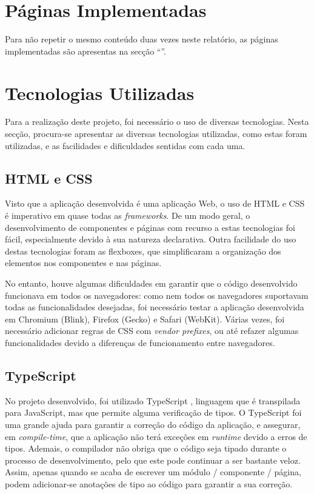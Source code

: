\documentclass[12pt, a4paper]{article}
\begin{document}
\section{Páginas Implementadas}

Para não repetir o mesmo conteúdo duas vezes neste relatório, as páginas implementadas são
apresentas na secção ``''.

\section{Tecnologias Utilizadas}

Para a realização deste projeto, foi necessário o uso de diversas tecnologias. Nesta secção,
procura-se apresentar as diversas tecnologias utilizadas, como estas foram utilizadas, e as
facilidades e dificuldades sentidas com cada uma.

\subsection{HTML e CSS}

Visto que a aplicação desenvolvida é uma aplicação Web, o uso de HTML e CSS é imperativo em quase
todas as \emph{frameworks}. De um modo geral, o desenvolvimento de componentes e páginas com recurso
a estas tecnologias foi fácil, especialmente devido à sua natureza declarativa. Outra facilidade do
uso destas tecnologias foram as flexboxes, que simplificaram a organização dos elementos nos
componentes e nas páginas.

No entanto, houve algumas dificuldades em garantir que o código desenvolvido funcionava em todos os
navegadores: como nem todos os navegadores suportavam todas as funcionalidades desejadas, foi
necessário testar a aplicação desenvolvida em Chromium (Blink), Firefox (Gecko) e Safari (WebKit).
Várias vezes, foi necessário adicionar regras de CSS com \emph{vendor prefixes}, ou até refazer
algumas funcionalidades devido a diferenças de funcionamento entre navegadores.

\subsection{TypeScript}


No projeto desenvolvido, foi utilizado TypeScript \cite{typescript}, linguagem que é transpilada
para JavaScript, mas que permite alguma verificação de tipos. O TypeScript foi uma grande ajuda para
garantir a correção do código da aplicação, e assegurar, em \emph{compile-time}, que a aplicação não
terá exceções em \emph{runtime} devido a erros de tipos. Ademais, o compilador não obriga que o
código seja tipado durante o processo de desenvolvimento, pelo que este pode continuar a ser
bastante veloz. Assim, apenas quando se acaba de escrever um módulo / componente / página, podem
adicionar-se anotações de tipo ao código para garantir a sua correção.
\end{document}
